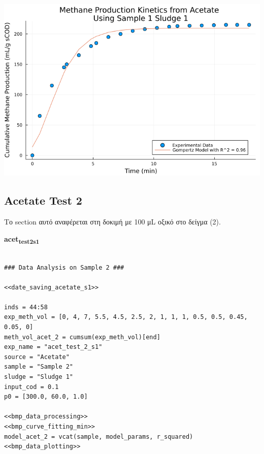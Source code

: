 \documentclass[11pt]{article}
\begin{document}
\begin{center}
\includegraphics[width=.9\linewidth]{../plots/BMPs/Acetate/methane_kinetics_acet_test_1_s1.png}
\end{center}

\subsection{Acetate Test 2}
\label{sec:orgf22178a}
Το section αυτό αναφέρεται στη δοκιμή με 100 μL οξικό στο δείγμα (2).

\textbf{acet\textsubscript{test}\textsubscript{2}\textsubscript{s1}}
\begin{verbatim}

### Data Analysis on Sample 2 ###

<<date_saving_acetate_s1>>

inds = 44:58
exp_meth_vol = [0, 4, 7, 5.5, 4.5, 2.5, 2, 1, 1, 1, 0.5, 0.5, 0.45, 0.05, 0]
meth_vol_acet_2 = cumsum(exp_meth_vol)[end]
exp_name = "acet_test_2_s1"
source = "Acetate"
sample = "Sample 2"
sludge = "Sludge 1"
input_cod = 0.1
p0 = [300.0, 60.0, 1.0]

<<bmp_data_processing>>
<<bmp_curve_fitting_min>>
model_acet_2 = vcat(sample, model_params, r_squared)
<<bmp_data_plotting>>
\end{verbatim}
\end{document}
